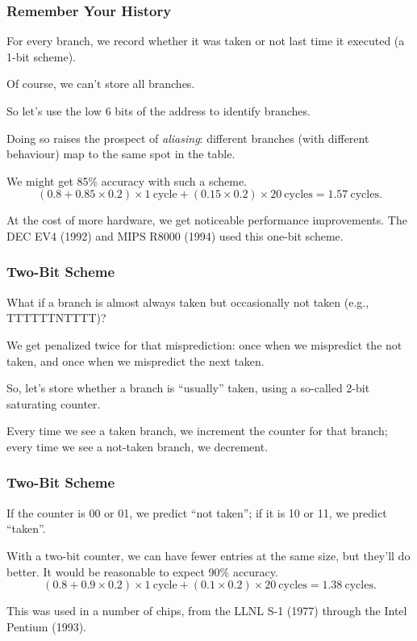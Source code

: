 \begin{frame}
\frametitle{Remember Your History}

For every branch,
we record whether it was taken or not last time it executed (a 1-bit scheme).


Of course, we can't store all branches. 

So let's use the low 6 bits of the address
to identify branches. 

Doing so raises the prospect of \emph{aliasing}:
different branches (with different behaviour) map to the same spot in the table.

We might get 85\% accuracy with such a scheme.
\[
(0.8 + 0.85 \times 0.2) \times 1 \mathrm{~cycle} + (0.15 \times 0.2) \times 20 \mathrm{~cycles} = 1.57 \mathrm{~cycles}.
\]

At the cost of more hardware, we get noticeable performance improvements. The DEC EV4 (1992) and
MIPS R8000 (1994) used this one-bit scheme.

\end{frame}


\begin{frame}
\frametitle{Two-Bit Scheme}

What if a branch is almost always taken but occasionally not taken (e.g., TTTTTTNTTTT)?

We get penalized twice
for that misprediction: once when we mispredict the not taken, and once when we mispredict the next taken. 

So, let's store whether a branch is ``usually'' taken, using a so-called
2-bit saturating counter.

Every time we see a taken branch, we increment the counter for that
branch; every time we see a not-taken branch, we decrement. 

\end{frame}


\begin{frame}
\frametitle{Two-Bit Scheme}

If the counter is 00 or 01, we predict ``not taken''; if it is 10 or
11, we predict ``taken''.

With a two-bit counter, we can have fewer entries at the same size, but they'll do better.
It would be reasonable to expect 90\% accuracy.
\[
(0.8 + 0.9 \times 0.2) \times 1 \mathrm{~cycle} + (0.1 \times 0.2) \times 20 \mathrm{~cycles} = 1.38 \mathrm{~cycles}.
\]

This was used in a number of chips, from the LLNL S-1 (1977) through the Intel Pentium (1993).



\end{frame}


